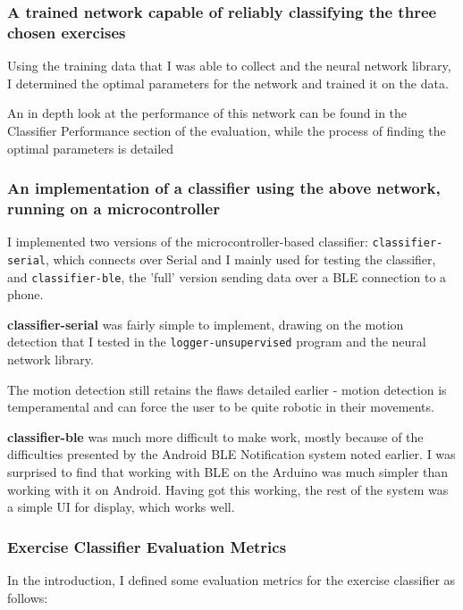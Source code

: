 \documentclass[a4paper]{article}
\begin{document}
\subsubsection{A trained network capable of reliably classifying the three chosen exercises}

Using the training data that I was able to collect and the neural network library, I determined the optimal parameters for the network and trained it on the data.

An in depth look at the performance of this network can be found in the Classifier Performance section of the evaluation, while the process of finding the optimal parameters is detailed 

\subsubsection{An implementation of a classifier using the above network, running on a microcontroller}

I implemented two versions of the microcontroller-based classifier: \lstinline{classifier-serial}, which connects over Serial and I mainly used for testing the classifier, and \lstinline{classifier-ble}, the 'full' version sending data over a BLE connection to a phone.

\textbf{classifier-serial} was fairly simple to implement, drawing on the motion detection that I tested in the \lstinline{logger-unsupervised} program and the neural network library.

The motion detection still retains the flaws detailed earlier - motion detection is temperamental and can force the user to be quite robotic in their movements.

\textbf{classifier-ble} was much more difficult to make work, mostly because of the difficulties presented by the Android BLE Notification system noted earlier. 
I was surprised to find that working with BLE on the Arduino was much simpler than working with it on Android. Having got this working, the rest of the system was a simple UI for display, which works well. 

\subsubsection{Exercise Classifier Evaluation Metrics}

In the introduction, I defined some evaluation metrics for the exercise classifier as follows:
\end{document}
